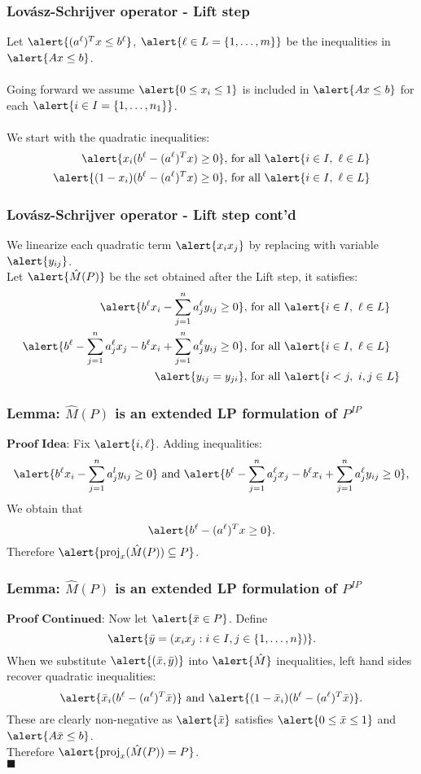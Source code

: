 \documentclass{beamer}
\DeclareMathOperator{\proj}{proj}
\begin{document}
\begin{frame}
\frametitle{Lov\'asz-Schrijver operator - Lift step}
Let $\alert{(a^\ell)^Tx \leq b^\ell}$, $\alert{\ell \in L = \{1, \dots, m\}}$ be the inequalities in $\alert{Ax \leq b}$. \\\ \\Going forward we assume $\alert{0 \leq x_i \leq 1}$ is included in $\alert{Ax \leq b}$ for each $\alert{i \in I = \{1,\dots,n_1\}}$.
\\\ \\ We start with the quadratic inequalities:
\begin{align*}
\alert{x_i(b^\ell - (a^\ell)^Tx) \geq 0}, &\text{ for all } \alert{i\in I,\ \ell \in L} \\
\alert{(1-x_i)(b^\ell - (a^\ell)^Tx) \geq 0}, &\text{ for all }\alert{ i\in I,\ \ell \in L} \\
\end{align*}
\end{frame}
\begin{frame}
\frametitle{Lov\'asz-Schrijver operator - Lift step cont'd}
We linearize each  quadratic term $\alert{x_{i}x_{j}}$ by replacing with variable $\alert{y_{ij}}$.\\
Let $\alert{\hat{M}(P)}$ be the set obtained after the Lift step, it satisfies:
\begin{align*}
\alert{b^\ell x_i - \sum_{j=1}^n a_j^\ell y_{ij} \geq 0}, &\text{ for all } \alert{i \in I,\ \ell \in L} \\
\alert{b^\ell - \sum_{j = 1}^n a^\ell_j x_j - b^\ell x_i + \sum_{j = 1}^n a_j^\ell y_{ij} \geq 0}, &\text{ for all } \alert{i \in I,\ \ell \in L} \\
\alert{y_{ij} = y_{ji}}, &\text{ for all } \alert{i<j,\ i,j \in L}
\end{align*}
\end{frame}

\begin{frame}
\frametitle{Lemma: $\hat{M}(P)$ is an extended LP formulation of $P^{IP}$}
$\textbf{Proof Idea:}$ Fix $\alert{i, \ell}$. Adding inequalities:
$$\alert{b^\ell x_i - \sum_{j=1}^n a_j^l y_{ij} \geq 0} \text{ and } \alert{b^\ell -\sum_{j=1}^n a_j^\ell x_j - b^\ell x_i + \sum_{j=1}^n a_j^\ell y_{ij} \geq 0},$$
We obtain that $$\alert{b^\ell -(a^\ell)^Tx \geq 0}.$$
Therefore $\alert{\proj_x(\hat{M}(P)) \subseteq P}$.
\end{frame}

\begin{frame}
\frametitle{Lemma: $\hat{M}(P)$ is an extended LP formulation of $P^{IP}$}
$\textbf{Proof Continued:}$ Now let $\alert{\bar{x} \in P}$. Define $$\alert{\bar{y}=(x_i x_j : i \in I, j \in \{1, \dots, n\})}.$$
When we substitute $\alert{(\bar{x},\bar{y})}$ into $\alert{\hat{M}}$ inequalities, left hand sides recover quadratic inequalities:
$$\alert{\bar{x}_i (b^\ell - (a^\ell)^T \bar{x})} \text{ and } \alert{(1-\bar{x}_i )(b^\ell - (a^\ell)^T \bar{x})}.$$
These are clearly non-negative as $\alert{\bar{x}}$ satisfies $\alert{0 \leq \bar{x} \leq 1}$ and $\alert{A \bar{x} \leq b}$.\\
Therefore $\alert{\proj_x(\hat{M}(P)) = P}$.\\$\blacksquare$
\end{frame}
\end{document}
